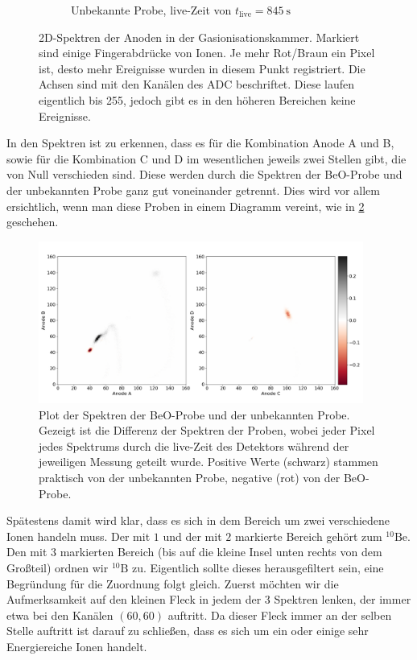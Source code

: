 \begin{figure}[h]
\begin{subfigure}{0.95\textwidth}
        \caption{Unbekannte Probe, live-Zeit von $t_{\text{live}} = \SI{845}{\second}$}
    \end{subfigure}
    \caption{2D-Spektren der Anoden in der Gasionisationskammer. Markiert sind einige \glqq Fingerabdrücke\grqq{} von Ionen. Je mehr Rot/Braun ein Pixel ist, desto mehr Ereignisse wurden in diesem Punkt registriert. Die Achsen sind mit den Kanälen des ADC beschriftet. Diese laufen eigentlich bis \num{255}, jedoch gibt es in den höheren Bereichen keine Ereignisse.}
    \label{Auswertung_Gasdetektor_2DSpektren}
\end{figure}
In den Spektren ist zu erkennen, dass es für die Kombination Anode A und B, sowie für die Kombination C und D im wesentlichen jeweils zwei Stellen gibt, die von Null verschieden sind.
Diese werden durch die Spektren der BeO-Probe und der unbekannten Probe ganz gut voneinander getrennt.
Dies wird vor allem ersichtlich, wenn man diese Proben in einem Diagramm vereint, wie in \ref{Auswertung_Bild_Gasdetektor_2DSpektren_BeO_unbekannt_relativ} geschehen.
\begin{figure}[h]
	\centering
    \includegraphics[width=0.95\textwidth]{Pictures/Gasdetektor/Gasdetektor_2DSpektrum_19_relativ_zu_22.png}
	\caption{Plot der Spektren der BeO-Probe und der unbekannten Probe. Gezeigt ist die Differenz der Spektren der Proben, wobei jeder Pixel jedes Spektrums durch die live-Zeit des Detektors während der jeweiligen Messung geteilt wurde. Positive Werte (schwarz) stammen praktisch von der unbekannten Probe, negative (rot) von der BeO-Probe.}
	\label{Auswertung_Bild_Gasdetektor_2DSpektren_BeO_unbekannt_relativ}
\end{figure}
Spätestens damit wird klar, dass es sich in dem Bereich um zwei verschiedene Ionen handeln muss.
Der mit $1$ und der mit $2$ markierte Bereich gehört zum $^{10}\text{Be}$.
Den mit $3$ markierten Bereich (bis auf die kleine Insel unten rechts von dem Großteil) ordnen wir $^{10}\text{B}$ zu.
Eigentlich sollte dieses herausgefiltert sein, eine Begründung für die Zuordnung folgt gleich.
Zuerst möchten wir die Aufmerksamkeit auf den kleinen Fleck in jedem der 3 Spektren lenken, der immer etwa bei den Kanälen $(60, 60)$ auftritt.
Da dieser Fleck immer an der selben Stelle auftritt ist darauf zu schließen, dass es sich um ein oder einige sehr Energiereiche Ionen handelt.

